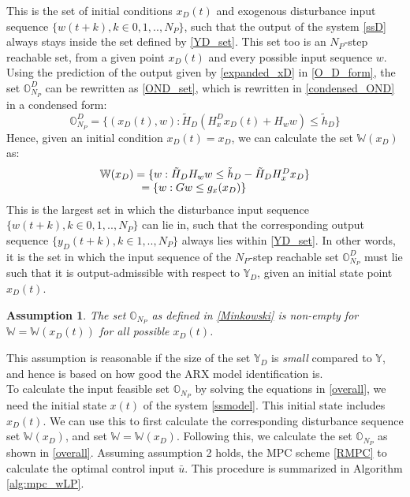\documentclass[letterpaper, 10 pt, conference]{ieeeconf}  %
\newtheorem{assumption}{Assumption}
\begin{document}
  This is the set of initial conditions $x_D(t)$ and exogenous disturbance input sequence $\{w(t+k),k \in 0, 1, .., N_P\}$, such that the output of the system \eqref{ssD} always stays inside the set defined by \eqref{YD_set}. This set too is an $N_P$-step reachable set, from a given point $x_D(t)$ and every possible input sequence $w$.
  Using the prediction of the output given by \eqref{expanded_xD} in \eqref{O_D_form}, 
  the set $\mathbb{O}_{N_P}^D$ can be rewritten as \eqref{OND_set}, which is rewritten in \eqref{condensed_OND} in a condensed form:
  \begin{equation}
  \mathbb{O}_{N_P}^D=\{(x_D(t),w): \tilde{H}_D(H_x^Dx_D(t)+H_ww) \leq \tilde{h}_D\}
  \label{condensed_OND}
  \end{equation}
  Hence, given an initial condition $x_D(t)=x_D$, we can calculate the set $\mathbb{W}(x_D)$ as:
  \begin{equation}
  \begin{matrix}
  \mathbb{W}(x_D) = \{w: \tilde{H}_DH_ww \leq \tilde{h}_D-\tilde{H}_DH_x^Dx_D\} \\
  \hspace{-20pt}
   = \{w: Gw \leq g_x(x_D)\}
   \end{matrix}
   \label{w_xd_set}
  \end{equation}
  This is the largest set in which the disturbance input sequence $\{w(t+k),k \in 0,1,..,N_P\}$ can lie in, such that the corresponding output sequence $\{y_D(t+k),k \in 1,..,N_P\}$ always lies within \eqref{YD_set}. In other words, it is the set in which the input sequence of the $N_P$-step reachable set $\mathbb{O}_{N_P}^D$ must lie such that it is output-admissible with respect to $\mathbb{Y}_D$, given an initial state point $x_D(t)$.
   \begin{assumption}
   The set $\mathbb{O}_{N_P}$ as defined in \eqref{Minkowski} is non-empty for $\mathbb{W}=\mathbb{W}(x_D(t))$ for all possible $x_D(t)$.
   \end{assumption}
     \noindent 
  This assumption is reasonable if the size of the set $\mathbb{Y}_D$ is \textit{small} compared to $\mathbb{Y}$, and hence is based on how good the ARX model identification is.\\\indent
  To calculate the input feasible set $\mathbb{O}_{N_P}$ by solving the equations in \eqref{overall}, we need the initial state $x(t)$ of the system \eqref{ssmodel}. This initial state includes $x_D(t)$. We can use this to first calculate the corresponding disturbance sequence set $\mathbb{W}(x_D)$, and set $\mathbb{W}=\mathbb{W}(x_D)$. Following this, we calculate the set $\mathbb{O}_{N_P}$ as shown in \eqref{overall}. Assuming assumption 2 holds, the MPC scheme \eqref{RMPC} to calculate the optimal control input $\bar{u}$. This procedure is summarized in Algorithm \ref{alg:mpc_wLP}.
\end{document}

